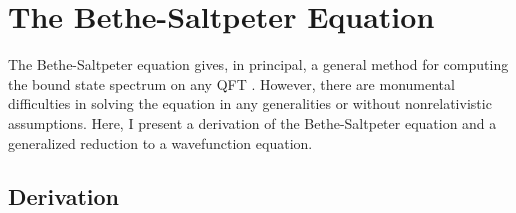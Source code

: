 \documentclass[12pt]{article}
\begin{document}
\section{The Bethe-Saltpeter Equation}

The Bethe-Saltpeter equation gives, in principal, a general method for computing the bound state spectrum on any QFT \citep{Bethe}. However, there are monumental difficulties in solving the equation in any generalities or without nonrelativistic assumptions. Here, I present a derivation of the Bethe-Saltpeter equation and a generalized reduction to a wavefunction equation. 

\subsection{Derivation}
\end{document}
